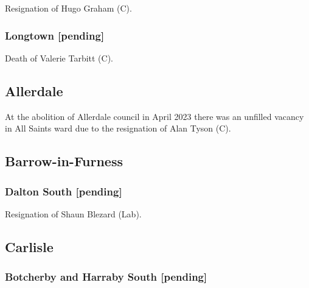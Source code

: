 \documentclass[a4paper,openany]{book}
\begin{document}
\begin{resultsiii}
Resignation of Hugo Graham (C).

\subsubsection*{Longtown \hspace*{\fill}\nolinebreak[1]%
	\enspace\hspace*{\fill}
	[pending]}


Death of Valerie Tarbitt (C).

\subsection*{Allerdale}

At the abolition of Allerdale council in April 2023 there was an unfilled vacancy in All Saints ward due to the resignation of Alan Tyson (C).%

\subsection*{Barrow-in-Furness}

\subsubsection*{Dalton South \hspace*{\fill}\nolinebreak[1]%
	\enspace\hspace*{\fill}
	[pending]}


Resignation of Shaun Blezard (Lab).

\subsection*{Carlisle}

\subsubsection*{Botcherby and Harraby South \hspace*{\fill}\nolinebreak[1]%
	\enspace\hspace*{\fill}
	[pending]}



\end{resultsiii}
\end{document}
